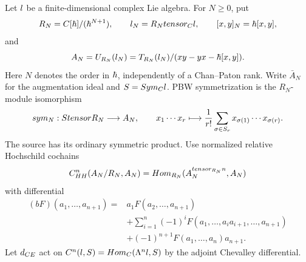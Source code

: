 Let $l$ be a finite-dimensional complex Lie algebra.
For $N\ge0$, put
\[
 R_N=C[\hbar]/(\hbar^{N+1}),\qquad
 l_N=R_Ntensor_Cl,\qquad
 [x,y]_N=\hbar[x,y],
\]
and
\[
 A_N=U_{R_N}(l_N)
 =T_{R_N}(l_N)/(xy-yx-\hbar[x,y]).
\]
Here $N$ denotes the order in $\hbar$, independently of a Chan--Paton rank.
Write $\bar A_N$ for the augmentation ideal and $S=Sym_Cl$.
PBW symmetrization is the $R_N$-module isomorphism
\[
 sym_N:Stensor R_N\longrightarrow A_N,
 \qquad
 x_1\cdots x_r\longmapsto
 \frac1{r!}\sum_{\sigma\in S_r}x_{\sigma(1)}\cdots x_{\sigma(r)}.
\]
The source has its ordinary symmetric product.
Use normalized relative Hochschild cochains
\[
 C^n_{HH}(A_N/R_N,A_N)
 =Hom_{R_N}(A_N^{tensor_{R_N}n},A_N)
\]
with differential
\[
\begin{split}
 (bF)(a_1,\ldots,a_{n+1})
 ={}&a_1F(a_2,\ldots,a_{n+1})\\
 &+\sum_{i=1}^n(-1)^iF(a_1,\ldots,a_i a_{i+1},\ldots,a_{n+1})\\
 &+(-1)^{n+1}F(a_1,\ldots,a_n)a_{n+1}.
\end{split}
\]
Let $d_{CE}$ act on
$C^n(l,S)=Hom_C(\Lambda^nl,S)$
by the adjoint Chevalley differential.

